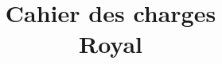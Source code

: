 \documentclass[T3,WIP]{rapport-iutrs}
\title{Cahier des charges\\Royal}
\begin{document}
\pagedegarde 

\newpage{}

\newpage{}

\tableofcontents
\newpage{}


\newpage{}


\newpage{}


\newpage{}


\newpage{}


\end{document}
